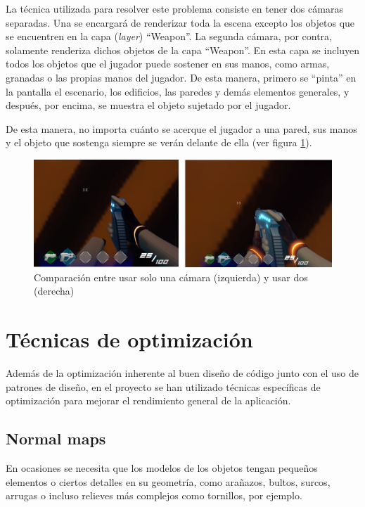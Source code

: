 La técnica utilizada para resolver este problema consiste en tener dos cámaras separadas. Una se encargará de renderizar toda la escena excepto los objetos que se encuentren en la capa (\textit{layer}) ``Weapon''. La segunda cámara, por contra, solamente renderiza dichos objetos de la capa ``Weapon''. En esta capa se incluyen todos los objetos que el jugador puede sostener en sus manos, como armas, granadas o las propias manos del jugador. De esta manera, primero se ``pinta'' en la pantalla el escenario, los edificios, las paredes y demás elementos generales, y después, por encima, se muestra el objeto sujetado por el jugador. 

De esta manera, no importa cuánto se acerque el jugador a una pared, sus manos y el objeto que sostenga siempre se verán delante de ella (ver figura \ref{fig:ComparacionCamaras}).

\begin{figure}[h]
	\centering
	\includegraphics[scale=0.45]{img/CameraClippingComparison.png}
	\caption{Comparación entre usar solo una cámara (izquierda) y usar dos (derecha)}
	\label{fig:ComparacionCamaras}
    \end{figure}
    
\section{Técnicas de optimización}
Además de la optimización inherente al buen diseño de código junto con el uso de patrones de diseño, en el proyecto se han utilizado técnicas específicas de optimización para mejorar el rendimiento general de la aplicación.
\subsection{Normal maps}
En ocasiones se necesita que los modelos de los objetos tengan pequeños elementos o ciertos detalles en su geometría, como arañazos, bultos, surcos, arrugas o incluso relieves más complejos como tornillos, por ejemplo.


